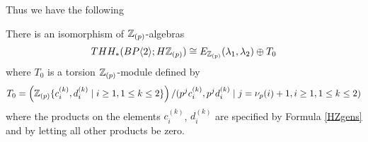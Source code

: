 Thus we have the following
\begin{cor}\label{BHZ}
There is an isomorphism of $\mathbb{Z}_{(p)}$-algebras
\[ THH_*(BP\langle 2 \rangle;H\mathbb{Z}_{(p)})\cong E_{\mathbb{Z}_{(p)}}(\lambda_1,\lambda_2)\oplus T_0\]
where $T_0$ is a torsion $\mathbb{Z}_{(p)}$-module defined by 
\[ T_0=\left (\mathbb{Z}_{(p)}\{c_i^{(k)},d_i^{(k)} \mid  i \ge 1, 1\le k\le 2\} \right )/(p^jc_i^{(k)}, p^jd_i^{(k)} \mid j=\nu_p(i)+1 ,  i \ge 1, 1\le k\le 2) \]
where the products on the elements $c_i^{(k)}$, $d_i^{(k)}$ are specified by Formula \eqref{HZgens} and by letting all other products be zero. 
\end{cor}
\begin{comment}
\gabe{Double check that we still need the remark below.}
\begin{rem}
In particular, we note that 
\[ THH_*(\B;H\Z_{(p)}) \cong E(\lambda_1)\otimes M \]
where $M$ is a free $\Z_{(p)}$ module generated by $\{1, \lambda_2\}$ tensored with a torsion $\Z_{(p)}$-module generated by $a^{(1)}_i, b_i^{(1)}$ with the same $p$-torsion as described above. We will write 
\[ THH_*(\B;H\Z_{(p)})/(\lambda_1) := M \] 
and  
\[ \lambda_1 \cdot THH_*(\B;H\Z_{(p)}) \]
for the elements in $THH_*(\B;H\Z_{(p)})$ that are $\lambda_1$-divisible, i.e. $M\{\lambda_1\}$. 
\end{rem} 
\end{comment}


